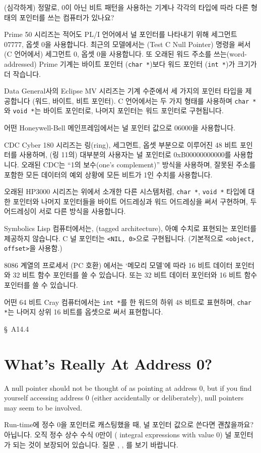 \begin{faq}
	(심각하게) 정말로, 0이 아닌 비트 패턴을 사용하는 기계나 각각의
	타입에 따라 다른 형태의 포인터를 쓰는 컴퓨터가 있나요?

\A
	Prime 50 시리즈는 적어도 PL/I 언어에서 널 포인터를 나타내기 위해
	세그먼트 07777, 옵셋 0을 사용합니다.  최근의 모델에서는 
	(Test C Null Pointer) 명령을 써서 (C 언어에서)
	세그먼트 0, 옵셋 0을 사용합니다.
	또 오래된 워드 주소를 쓰는(word-addressed) Prime 기계는
	바이트 포인터 (\verb+char *+)보다 워드 포인터 (\verb+int *+)가
	크기가 더 작습니다.

	Data General사의 Eclipse MV 시리즈는 기계 수준에서 세 가지의
	포인터 타입을 제공합니다 (워드, 바이트, 비트 포인터).  C 언어에서는
	두 가지 형태를 사용하며 \verb+char *+와 \verb+void *+는 
	바이트 포인터로, 나머지 포인터는 워드 포인터로 구현됩니다.

	어떤 Honeywell-Bell 메인프레임에서는 널 포인터 값으로 06000을
	사용합니다.

	CDC Cyber 180 시리즈는 링(ring), 세그먼트, 옵셋 부분으로 이루어진
	48 비트 포인터를 사용하며, (링 11의) 대부분의 사용자는 널 포인터로
	0xB00000000000를 사용합니다.  오래된 CDC는
        ``1의 보수(one's complement)''
	방식을 사용하며, 잘못된 주소를 포함한 모든 데이터의 예외 상황에
	모든 비트가 1인 수치를 사용합니다.

	오래된 HP3000 시리즈는 위에서 소개한 다른 시스템처럼, \verb+char *+,
	\verb+void *+ 타입에 대한 포인터와 나머지 포인터들을 바이트 어드레싱과
	워드 어드레싱을 써서 구현하며, 두 어드레싱이 서로 다른 방식을
	사용합니다.  

	Symbolics Lisp 컴퓨터에서는, (tagged architecture), 아예 수치로
	표현되는 포인터를 제공하지 않습니다.  C 널 포인터는 \verb+<NIL, 0>+으로
	구현됩니다.  (기본적으로 \verb+<object, offset>+을 사용함.)

	8086 계열의 프로세서 (PC 호환) 에서는 `메모리 모델'에 따라
	16 비트 데이터 포인터와 32 비트 함수 포인터를 쓸 수 있습니다.
	또는 32 비트 데이터 포인터와 16 비트 함수 포인터를 쓸 수 있습니다.

	어떤 64 비트 Cray 컴퓨터에서는 \verb+int *+를 한 워드의 하위 48
	비트로 표현하며, \verb+char *+는 나머지 상위 16 비트를 옵셋으로 써서
	표현합니다.

\R
	\cite{kr1} \S\ A14.4 
\end{faq}

\section{What's Really At Address 0?}
A null pointer should not be thought of as pointing at address 0, but if you
find yourself accessing address 0 (either accidentally or deliberately),
null pointers may seem to be involved.
\begin{faq}
	Run-time에 정수 0을 포인터로 캐스팅했을 때, 널 포인터 값으로 쓴다면
	괜찮을까요?
\A
	아닙니다. 오직 정수 상수 수식 0만이 ( integral expressions
	with value 0) 널 포인터가 되는 것이 보장되어 있습니다. 질문 ,
	, 를 보기 바랍니다.
\end{faq}


